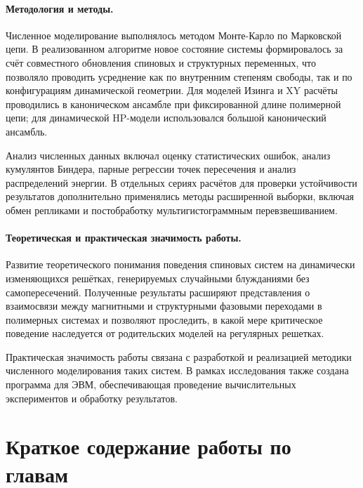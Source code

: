 \paragraph*{Методология и методы.}

Численное моделирование выполнялось методом Монте-Карло по Марковской цепи. В реализованном алгоритме новое состояние системы формировалось за счёт совместного обновления спиновых и структурных переменных, что позволяло проводить усреднение как по внутренним степеням свободы, так и по конфигурациям динамической геометрии. Для моделей Изинга и XY расчёты проводились в каноническом ансамбле при фиксированной длине полимерной цепи; для динамической HP-модели использовался большой канонический ансамбль.
 
Анализ численных данных включал оценку статистических ошибок, анализ кумулянтов Биндера, парные регрессии точек пересечения и анализ распределений энергии. 
В отдельных сериях расчётов для проверки устойчивости результатов дополнительно применялись методы расширенной выборки, включая обмен репликами и постобработку мультигистограммным перевзвешиванием.


\paragraph*{Теоретическая и практическая значимость работы.}

Развитие теоретического понимания поведения спиновых систем на динамически изменяющихся решётках, генерируемых случайными блужданиями без самопересечений. Полученные результаты расширяют представления о взаимосвязи между магнитными и структурными фазовыми переходами в полимерных системах  и позволяют проследить, в какой мере критическое поведение наследуется от родительских моделей на регулярных решетках.

Практическая значимость работы связана с разработкой и реализацией методики численного моделирования таких систем.
 В рамках исследования также создана программа для ЭВМ, обеспечивающая проведение вычислительных экспериментов и обработку результатов.


\section*{Краткое содержание работы по главам}

